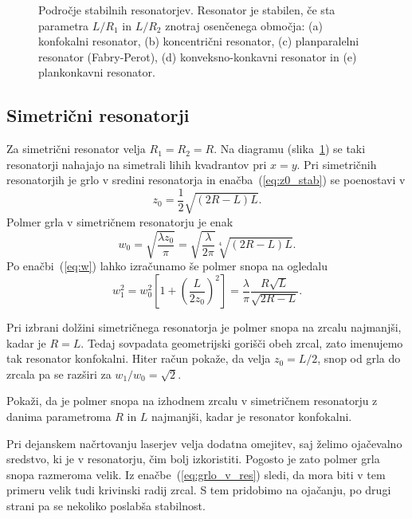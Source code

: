 \begin{figure}[h]
\centering
\def\svgwidth{100truemm} 

\caption{Področje stabilnih resonatorjev. Resonator je stabilen, 
če sta parametra $L/R_{1}$ in $L/R_{2}$ znotraj osenčenega območja: (a) konfokalni resonator,
(b) koncentrični resonator, (c) planparalelni resonator (Fabry-Perot), 
(d) konveksno-konkavni resonator in (e) plankonkavni resonator.}
\label{fig:Podrocje-stabilnih-resonatorjev}
\end{figure}

\subsection*{Simetrični resonatorji}
Za simetrični resonator velja $R_{1}=R_{2}=R$. Na diagramu 
(slika~\ref{fig:Podrocje-stabilnih-resonatorjev}) 
se taki resonatorji nahajajo na simetrali lihih kvadrantov pri $x=y$. Pri simetričnih resonatorjih 
je grlo v sredini resonatorja in enačba~(\ref{eq:z0_stab}) se poenostavi v 
\begin{equation}
z_{0}=\frac{1}{2}\sqrt{(2R-L)L}.
\label{eq:zosim}
\end{equation}
Polmer grla v simetričnem resonatorju je enak
\begin{equation}
w_{0}=\sqrt{\frac{\lambda z_{0}}{\pi}}=\sqrt{\frac{\lambda}{2\pi}}\sqrt[4]{(2R-L)L}.
\label{eq:grlo_v_res}
\end{equation}
Po enačbi~(\ref{eq:w}) lahko izračunamo še polmer snopa na ogledalu
\begin{equation}
w_{1}^{2}=w_{0}^{2}\left[1+\left(\frac{L}{2z_{0}}\right)^{2}\right]=
\frac{\lambda}{\pi}\frac{R\sqrt{L}}{\sqrt{2R-L}}.
\end{equation}

Pri izbrani dolžini simetričnega resonatorja je polmer snopa na zrcalu najmanjši,
kadar je $R=L$. Tedaj sovpadata geometrijski gorišči obeh zrcal,
zato imenujemo tak resonator konfokalni. 
Hiter račun pokaže, da velja $z_{0}=L/2$, snop od grla do zrcala pa se razširi
za $w_1/w_0=\sqrt{2}$. 
\begin{definition}
\label{naloga:uklon_konf}
 Pokaži, da je polmer snopa na izhodnem zrcalu v simetričnem resonatorju z
 danima parametroma $R$ in $L$ najmanjši, kadar je resonator konfokalni.
\end{definition}

Pri dejanskem načrtovanju laserjev velja dodatna omejitev, saj želimo 
ojačevalno sredstvo, ki je v resonatorju, čim bolj izkoristiti. Pogosto je zato 
polmer grla snopa razmeroma velik. Iz enačbe~(\ref{eq:grlo_v_res})
sledi, da mora biti v tem primeru velik tudi krivinski radij zrcal. S tem
pridobimo na ojačanju, po drugi strani pa se nekoliko poslabša stabilnost.

